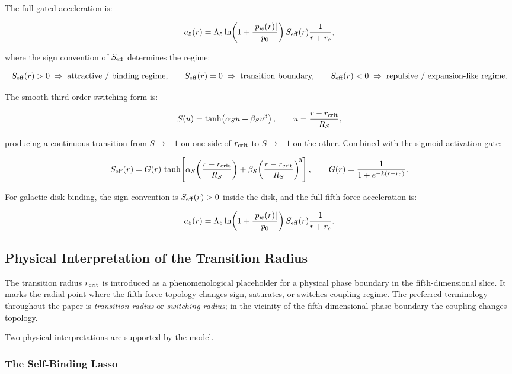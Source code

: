 \documentclass[11pt,a4paper]{article}
\newcommand{\pw}{p_w}                        %
\newcommand{\Lf}{\Lambda_5}                  %
\newcommand{\afiver}{a_5}                    %
\newcommand{\Seff}{S_{\rm eff}}              %
\newcommand{\rcrit}{r_{\rm crit}}            %
\begin{document}
The full gated acceleration is:

\[
  \afiver(r) = \Lf\ln\!\left(1+\frac{|\pw(r)|}{p_0}\right) \Seff(r)
  \frac{1}{r+r_c} ,
\]

where the sign convention of $\Seff$ determines the regime:

\[
  \Seff(r) > 0 \;\Rightarrow\; \text{attractive / binding regime,} \qquad
  \Seff(r) = 0 \;\Rightarrow\; \text{transition boundary,} \qquad
  \Seff(r) < 0 \;\Rightarrow\; \text{repulsive / expansion-like regime.}
\]

The smooth third-order switching form is:

\[
  S(u) = \tanh\!\left(\alpha_S u + \beta_S u^3\right),
  \qquad
  u = \frac{r - \rcrit}{R_S} ,
\]

producing a continuous transition from $S \to -1$ on one side of $\rcrit$
to $S \to +1$ on the other.  Combined with the sigmoid activation gate:

\begin{keybox}
\[
  \Seff(r) = G(r)\,\tanh\!\left[\alpha_S\!\left(\frac{r-\rcrit}{R_S}\right)
  + \beta_S\!\left(\frac{r-\rcrit}{R_S}\right)^{\!3}\right] ,
  \qquad
  G(r) = \frac{1}{1+e^{-k(r-r_0)}} .
\]
\end{keybox}

\noindent
For galactic-disk binding, the sign convention is $\Seff(r) > 0$ inside the
disk, and the full fifth-force acceleration is:

\[
  \afiver(r) = \Lf\ln\!\left(1+\frac{|\pw(r)|}{p_0}\right)
  \Seff(r) \frac{1}{r+r_c} .
\]

\subsection{Physical Interpretation of the Transition Radius}\label{sec:transition}

The transition radius $\rcrit$ is introduced as a phenomenological placeholder
for a physical phase boundary in the fifth-dimensional slice.  It marks the
radial point where the fifth-force topology changes sign, saturates, or
switches coupling regime.  The preferred terminology throughout the paper is
\emph{transition radius} or \emph{switching radius}; in the vicinity of the
fifth-dimensional phase boundary the coupling changes topology.

Two physical interpretations are supported by the model.

\subsubsection{The Self-Binding Lasso}
\end{document}
